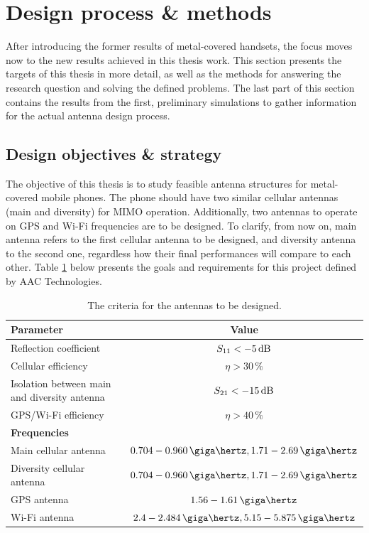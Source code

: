 \section{Design process \& methods}
\label{sec:objectives}
After introducing the former results of metal-covered handsets, the focus moves now to the new results achieved in this thesis work. This section presents the targets of this thesis in more detail, as well as the methods for answering the research question and solving the defined problems. The last part of this section contains the results from the first, preliminary simulations to gather information for the actual antenna design process.

\subsection{Design objectives \& strategy}
\label{sec:strategy}
The objective of this thesis is to study feasible antenna structures for metal-covered mobile phones. The phone should have two similar cellular antennas (main and diversity) for MIMO operation. Additionally, two antennas to operate on GPS and Wi-Fi frequencies are to be designed. To clarify, from now on, main antenna refers to the first cellular antenna to be designed, and diversity antenna to the second one, regardless how their final performances will compare to each other. Table \ref{tab:design_goals} below presents the goals and requirements for this project defined by AAC Technologies.

\begin{table}[H]
    \centering
    \caption{The criteria for the antennas to be designed.}
    \label{tab:design_goals}
    \begin{tabular}{|l|c|}
        \hline
         \textbf{Parameter} & \textbf{Value} \\
         \hline
         Reflection coefficient & $S_{11} < -5\,\mathrm{dB}$\\
         \hline
         Cellular efficiency & $\eta > 30\,\%$\\
         \hline
         Isolation between main and diversity antenna & $S_{21} < -15\,\mathrm{dB}$\\
         \hline
         GPS/Wi-Fi efficiency & $\eta > 40\,\%$\\
         \hline\hline
         \textbf{Frequencies} & \\
         \hline
         Main cellular antenna & $0.704-0.960\,\giga\hertz, 1.71-2.69\,\giga\hertz$\\
         \hline
         Diversity cellular antenna & $0.704-0.960\,\giga\hertz, 1.71-2.69\,\giga\hertz$\\
         \hline
         GPS antenna & $1.56-1.61\,\giga\hertz$\\
         \hline
         Wi-Fi antenna & $2.4-2.484\,\giga\hertz, 5.15-5.875\,\giga\hertz$\\
         \hline
    \end{tabular}
\end{table}

